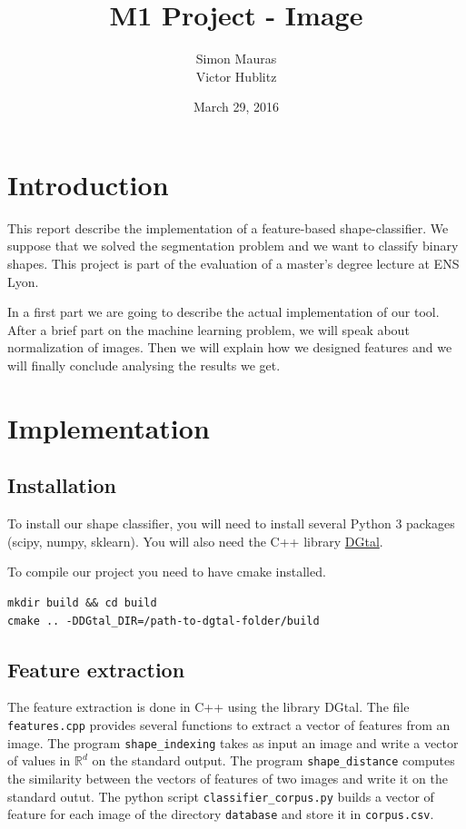 \documentclass[a4paper, 11pt]{article}
\title{M1 Project - Image}
\author{Simon Mauras \\ Victor Hublitz}
\date{March 29,  2016}
\begin{document}
\maketitle

\tableofcontents

\newpage
\section{Introduction}

This report describe the implementation of a feature-based shape-classifier. We suppose that we solved the segmentation problem and we want to classify binary shapes. This project is part of the evaluation of a master's degree lecture at ENS Lyon.

In a first part we are going to describe the actual implementation of our tool. After a brief part on the machine learning problem, we will speak about normalization of images. Then we will explain how we designed features and we will finally conclude analysing the results we get.

\section{Implementation}

\subsection{Installation}
To install our shape classifier, you will need to install several Python 3 packages (scipy, numpy, sklearn). You will also need the C++ library \href{http://dgtal.org}{DGtal}.

\medskip\noindent To compile our project you need to have cmake installed.
\begin{verbatim}
mkdir build && cd build
cmake .. -DDGtal_DIR=/path-to-dgtal-folder/build
\end{verbatim}

\subsection{Feature extraction}

The feature extraction is done in C++ using the library DGtal. The file \verb|features.cpp| provides several functions to extract a vector of features from an image. 
The program \verb|shape_indexing| takes as input an image and write a vector of values in $\mathbb R^d$ on the standard output.
The program \verb|shape_distance| computes the similarity between the vectors of features of two images and write it on the standard outut.
The python script \verb|classifier_corpus.py| builds a vector of feature for each image of the directory \verb|database| and store it in \verb|corpus.csv|.
\end{document}
